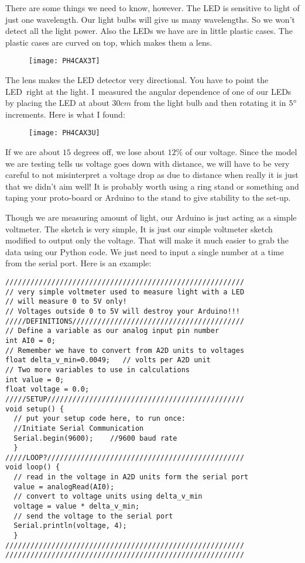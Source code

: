 There are some things we need to know, however. The LED is sensitive to
light of just one wavelength. Our light bulbs will give us many wavelengths.
So we won't detect all the light power. Also the LEDs we have are in little
plastic cases. The plastic cases are curved on top, which makes them a lens. 
\begin{figure}[h!]
\texttt{[image: PH4CAX3T]}
\end{figure}The lens makes the LED detector
very directional. You have to point the LED\ right at the light. I\ measured
the angular dependence of one of our LEDs by placing the LED at about $30%
\unit{cm}$ from the light bulb and then rotating it in $5\unit{%
{{}^\circ}%
}$ increments. Here is what I found: \begin{figure}[h!]
\texttt{[image: PH4CAX3U]}
\end{figure}If we are about $15$ degrees off,
we lose about $12\%$ of our voltage. Since the model we are testing tells us
voltage goes down with distance, we will have to be very careful to not
misinterpret a voltage drop as due to distance when really it is just that
we didn't aim well! It is probably worth using a ring stand or something and
taping your proto-board or Arduino to the stand to give stability to the
set-up.

Though we are measuring amount of light, our Arduino is just acting as a
simple voltmeter. The sketch is very simple, It is just our simple voltmeter
sketch modified to output only the voltage. That will make it much easier to
grab the data using our Python code. We just need to input a single number
at a time from the serial port. Here is an example:
 \begin{lstlisting}[language=Arduino]
/////////////////////////////////////////////////////////
// very simple voltmeter used to measure light with a LED
// will measure 0 to 5V only!
// Voltages outside 0 to 5V will destroy your Arduino!!!
/////DEFINITIONS/////////////////////////////////////////
// Define a variable as our analog input pin number
int AI0 = 0;
// Remember we have to convert from A2D units to voltages
float delta_v_min=0.0049;   // volts per A2D unit
// Two more variables to use in calculations
int value = 0;
float voltage = 0.0;
/////SETUP///////////////////////////////////////////////
void setup() {
  // put your setup code here, to run once:
  //Initiate Serial Communication
  Serial.begin(9600);    //9600 baud rate
  }
/////LOOP?///////////////////////////////////////////////
void loop() {
  // read in the voltage in A2D units form the serial port
  value = analogRead(AI0); 
  // convert to voltage units using delta_v_min
  voltage = value * delta_v_min;
  // send the voltage to the serial port 
  Serial.println(voltage, 4);  
  }
/////////////////////////////////////////////////////////
/////////////////////////////////////////////////////////
 \end{lstlisting}

